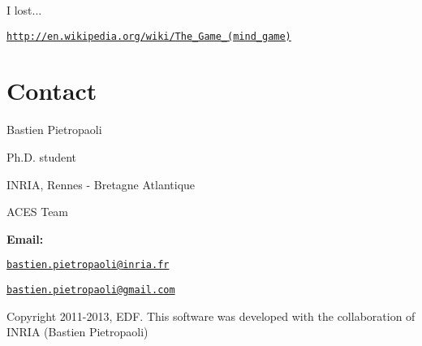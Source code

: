 I lost...

\href{http://en.wikipedia.org/wiki/The_Game_(mind_game)}{\tt http\-://en.\-wikipedia.\-org/wiki/\-The\-\_\-\-Game\-\_\-(mind\-\_\-game)}\hypertarget{origin_page_Origin_contact}{}\section{Contact}\label{origin_page_Origin_contact}
Bastien Pietropaoli \par
 Ph.\-D. student \par
 I\-N\-R\-I\-A, Rennes -\/ Bretagne Atlantique \par
 A\-C\-E\-S Team \par


{\bfseries Email\-:} \par
 \href{mailto:bastien.pietropaoli@inria.fr}{\tt bastien.\-pietropaoli@inria.\-fr} \par
 \href{mailto:bastien.pietropaoli@gmail.com}{\tt bastien.\-pietropaoli@gmail.\-com} \par


Copyright 2011-\/2013, E\-D\-F. This software was developed with the collaboration of I\-N\-R\-I\-A (Bastien Pietropaoli) 